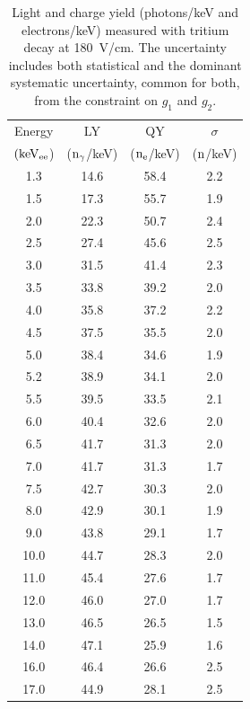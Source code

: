 \begin{table}[h!]
\centering
\begin{tabular}{|c|c|c|c|} \hline
Energy 	& 		LY	& 	QY	& $\sigma$ \\ 
$\rm (keV_{ee}$) & ($\rm n_\gamma$/keV)   & ($\rm n_e$/keV) & ($\rm n$/keV) \\ \hline
1.3 	 & 14.6 	 & 58.4 	 & 2.2 	 \\ \hline 
1.5 	 & 17.3 	 & 55.7 	 & 1.9 	 \\ \hline 
2.0 	 & 22.3 	 & 50.7 	 & 2.4 	 \\ \hline 
2.5 	 & 27.4 	 & 45.6 	 & 2.5 	 \\ \hline 
3.0 	 & 31.5 	 & 41.4 	 & 2.3 	 \\ \hline 
3.5 	 & 33.8 	 & 39.2 	 & 2.0 	 \\ \hline 
4.0 	 & 35.8 	 & 37.2 	 & 2.2 	 \\ \hline 
4.5 	 & 37.5 	 & 35.5 	 & 2.0 	 \\ \hline 
5.0 	 & 38.4 	 & 34.6 	 & 1.9 	 \\ \hline 
5.2 	 & 38.9 	 & 34.1 	 & 2.0 	 \\ \hline 
5.5 	 & 39.5 	 & 33.5 	 & 2.1 	 \\ \hline 
6.0 	 & 40.4 	 & 32.6 	 & 2.0 	 \\ \hline 
6.5 	 & 41.7 	 & 31.3 	 & 2.0 	 \\ \hline 
7.0 	 & 41.7 	 & 31.3 	 & 1.7 	 \\ \hline 
7.5 	 & 42.7 	 & 30.3 	 & 2.0 	 \\ \hline 
8.0 	 & 42.9 	 & 30.1 	 & 1.9 	 \\ \hline 
9.0 	 & 43.8 	 & 29.1 	 & 1.7 	 \\ \hline 
10.0 	 & 44.7 	 & 28.3 	 & 2.0 	 \\ \hline 
11.0 	 & 45.4 	 & 27.6 	 & 1.7 	 \\ \hline 
12.0 	 & 46.0 	 & 27.0 	 & 1.7 	 \\ \hline 
13.0 	 & 46.5 	 & 26.5 	 & 1.5 	 \\ \hline 
14.0 	 & 47.1 	 & 25.9 	 & 1.6 	 \\ \hline 
16.0 	 & 46.4 	 & 26.6 	 & 2.5 	 \\ \hline 
17.0 	 & 44.9 	 & 28.1 	 & 2.5 	 \\ \hline 
\end{tabular}
\caption{Light and charge yield (photons/keV and electrons/keV) measured with tritium decay at 180~V/cm. The uncertainty includes both statistical and the dominant systematic uncertainty, common for both, from the constraint on $g_1$ and $g_2$.}
\label{table:Yields}
\end{table}

